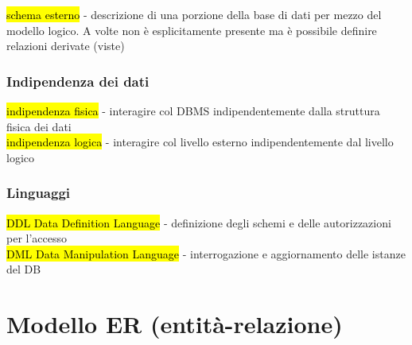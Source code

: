 \documentclass[a4paper]{article}
\begin{document}
\hl{schema esterno} - descrizione di una porzione della base di dati per mezzo del modello logico. A volte non è esplicitamente presente ma è possibile definire relazioni derivate (viste)\par \subsubsection{Indipendenza dei dati}
\hl{indipendenza fisica} - interagire col DBMS indipendentemente dalla struttura fisica dei dati\\
\hl{indipendenza logica} - interagire col livello esterno indipendentemente dal livello logico\par \subsubsection{Linguaggi}
\hl{DDL Data Definition Language} - definizione degli schemi e delle autorizzazioni per l’accesso\\
\hl{DML Data Manipulation Language} - interrogazione e aggiornamento delle istanze del DB\par \section{Modello ER (entità-relazione)}
\end{document}
